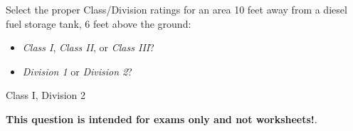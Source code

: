 

Select the proper Class/Division ratings for an area 10 feet away from a diesel fuel storage tank, 6 feet above the ground:

\begin{itemize}
\item{} {\it Class I}, {\it Class II}, or {\it Class III}?
\vskip 10pt
\item{} {\it Division 1} or {\it Division 2}?
\end{itemize}







Class I, Division 2







{\bf This question is intended for exams only and not worksheets!}.



